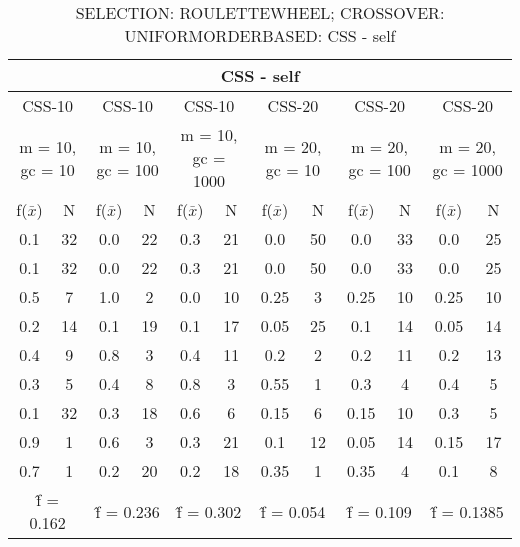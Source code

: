 \begin{table}[H]
	\centering
	\caption{SELECTION: ROULETTEWHEEL; CROSSOVER: UNIFORMORDERBASED: CSS - self}
	\begin{adjustbox}{width=1\textwidth}
		\begin{tabular}{ |c|c||c|c||c|c||c|c||c|c||c|c| }
			\hline
			\multicolumn{12}{|c|}{CSS - self} \\
			\hline
			\multicolumn{2}{|c||}{CSS-10} & \multicolumn{2}{c||}{CSS-10} & \multicolumn{2}{c||}{CSS-10} & \multicolumn{2}{c||}{CSS-20} & \multicolumn{2}{c||}{CSS-20} & \multicolumn{2}{c|}{CSS-20}\\
			\hline
			\multicolumn{2}{|c||}{m = 10, gc = 10} & \multicolumn{2}{c||}{m = 10, gc = 100} & \multicolumn{2}{c||}{m = 10, gc = 1000} & \multicolumn{2}{c||}{m = 20, gc = 10} & \multicolumn{2}{c||}{m = 20, gc = 100} & \multicolumn{2}{c|}{m = 20, gc = 1000}\\
			\hline
			f($\bar{x}$) & N & f($\bar{x}$) & N & f($\bar{x}$) & N & f($\bar{x}$) & N & f($\bar{x}$) & N & f($\bar{x}$) & N\\
			\hline
			\hline
			0.1 & 32 & 0.0 & 22 & 0.3 & 21 & 0.0 & 50 & 0.0 & 33 & 0.0 & 25\\
			\hline
			0.1 & 32 & 0.0 & 22 & 0.3 & 21 & 0.0 & 50 & 0.0 & 33 & 0.0 & 25\\
			0.5 & 7 & 1.0 & 2 & 0.0 & 10 & 0.25 & 3 & 0.25 & 10 & 0.25 & 10\\
			0.2 & 14 & 0.1 & 19 & 0.1 & 17 & 0.05 & 25 & 0.1 & 14 & 0.05 & 14\\
			0.4 & 9 & 0.8 & 3 & 0.4 & 11 & 0.2 & 2 & 0.2 & 11 & 0.2 & 13\\
			0.3 & 5 & 0.4 & 8 & 0.8 & 3 & 0.55 & 1 & 0.3 & 4 & 0.4 & 5\\
			0.1 & 32 & 0.3 & 18 & 0.6 & 6 & 0.15 & 6 & 0.15 & 10 & 0.3 & 5\\
			0.9 & 1 & 0.6 & 3 & 0.3 & 21 & 0.1 & 12 & 0.05 & 14 & 0.15 & 17\\
			0.7 & 1 & 0.2 & 20 & 0.2 & 18 & 0.35 & 1 & 0.35 & 4 & 0.1 & 8\\
			\hline
			\multicolumn{2}{|c||}{\^{f} = 0.162} & \multicolumn{2}{c||}{\^{f} = 0.236} & \multicolumn{2}{c||}{\^{f} = 0.302} & \multicolumn{2}{c||}{\^{f} = 0.054} & \multicolumn{2}{c||}{\^{f} = 0.109} & \multicolumn{2}{c|}{\^{f} = 0.1385}\\
			\hline
		\end{tabular}
	\end{adjustbox}
\end{table}
